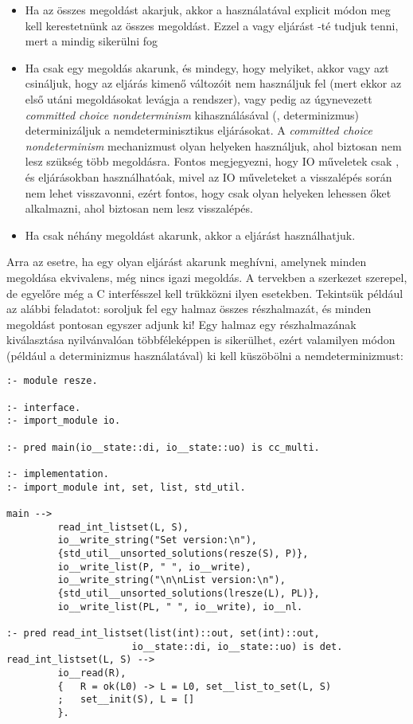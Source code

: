\begin{itemize}
\item Ha az összes megoldást akarjuk, akkor a  használatával
explicit módon meg kell kerestetnünk az összes megoldást. Ezzel a  vagy
 eljárást -té tudjuk tenni, mert a  mindig
sikerülni fog
\item Ha csak egy megoldás akarunk, és mindegy, hogy melyiket, akkor vagy azt csináljuk,
hogy az eljárás kimenő változóit nem használjuk fel (mert ekkor az első utáni megoldásokat
levágja a rendszer), vagy pedig az úgynevezett \emph{committed choice nondeterminism}
kihasználásával (,  determinizmus) determinizáljuk a
nemdeterminisztikus eljárásokat. A \emph{committed choice nondeterminism} mechanizmust
olyan helyeken használjuk, ahol biztosan nem lesz szükség több megoldásra. Fontos
megjegyezni, hogy IO műveletek csak ,  és 
eljárásokban használhatóak, mivel az IO műveleteket a visszalépés során nem lehet
visszavonni, ezért fontos, hogy csak olyan helyeken lehessen őket alkalmazni, ahol
biztosan nem lesz visszalépés.
\item Ha csak néhány megoldást akarunk, akkor a  eljárást
használhatjuk.
\end{itemize}

Arra az esetre, ha egy olyan eljárást akarunk meghívni, amelynek minden megoldása
ekvivalens, még nincs igazi megoldás. A tervekben a  szerkezet
szerepel, de egyelőre még a C interfésszel kell trükközni ilyen esetekben.
\br
Tekintsük például az alábbi feladatot: soroljuk fel egy halmaz összes részhalmazát,
és minden megoldást pontosan egyszer adjunk ki! Egy halmaz egy részhalmazának
kiválasztása nyilvánvalóan többféleképpen is sikerülhet, ezért valamilyen módon
(például a  determinizmus használatával) ki kell küszöbölni a
nemdeterminizmust:

\begin{verbatim}
:- module resze.

:- interface.
:- import_module io.

:- pred main(io__state::di, io__state::uo) is cc_multi.

:- implementation.
:- import_module int, set, list, std_util.

main -->
         read_int_listset(L, S),
         io__write_string("Set version:\n"),
         {std_util__unsorted_solutions(resze(S), P)},
         io__write_list(P, " ", io__write),
         io__write_string("\n\nList version:\n"),
         {std_util__unsorted_solutions(lresze(L), PL)},
         io__write_list(PL, " ", io__write), io__nl.

:- pred read_int_listset(list(int)::out, set(int)::out,
                      io__state::di, io__state::uo) is det.
read_int_listset(L, S) -->
         io__read(R),
         {   R = ok(L0) -> L = L0, set__list_to_set(L, S)
         ;   set__init(S), L = []
         }.
\end{verbatim}

